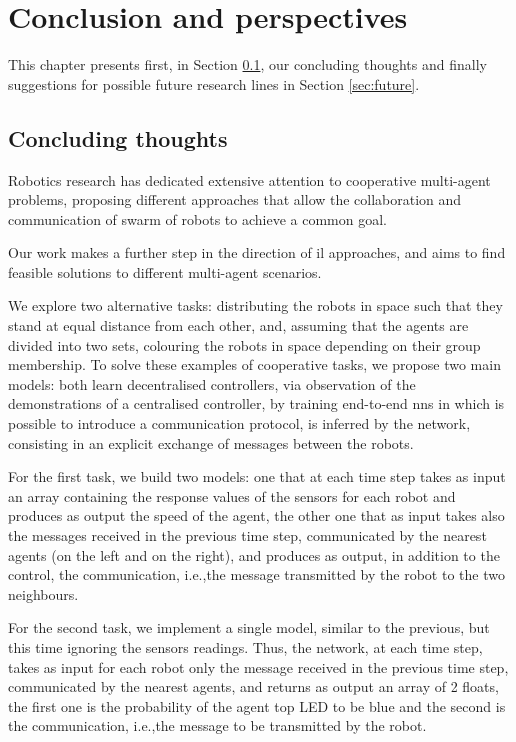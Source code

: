 \chapter*{Conclusion and perspectives}
\label{chap:concl}
 
This chapter presents first, in Section \ref{sec:concl}, our concluding thoughts and 
finally suggestions for possible future research lines in Section \ref{sec:future}.

\section{Concluding thoughts}
\label{sec:concl}
Robotics research has dedicated extensive attention to cooperative multi-agent 
problems, proposing different approaches that allow the collaboration and 
communication of swarm of robots to achieve a common goal.

Our work makes a further step in the direction of \gls{il} approaches, and aims to 
find feasible solutions to different multi-agent scenarios.

We explore two alternative tasks: distributing the robots in space such that they 
stand at equal distance from each other, and, assuming that the agents are 
divided into two sets, colouring the robots in space depending on their group 
membership.
To solve these examples of cooperative tasks, we propose two main models: both 
learn decentralised controllers, via observation of the demonstrations of a 
centralised controller, by training end-to-end \glspl{nn} in which is possible to
introduce a communication protocol, is inferred by the network, consisting in an 
explicit exchange of messages between the robots.

For the first task, we build two models: one that at each time step takes as input 
an array containing the response values of the sensors for each robot and 
produces as output the speed of the agent, the other one that as input takes also 
the messages received in the previous time step, communicated by the nearest 
agents (on the left and on the right), and produces as output, in addition to the 
control, the communication, i.e.,the message transmitted by the robot to the two 
neighbours. 

For the second task, we implement a single model, similar to the previous, but this 
time ignoring the sensors readings. Thus, the network, at each time step, takes as 
input for each robot only the message received in the previous time step, 
communicated by the nearest agents, and returns as output an array of 2 floats, 
the first one is the probability of the agent top LED to be blue and the second is 
the communication, i.e.,the message to be transmitted by the robot.


